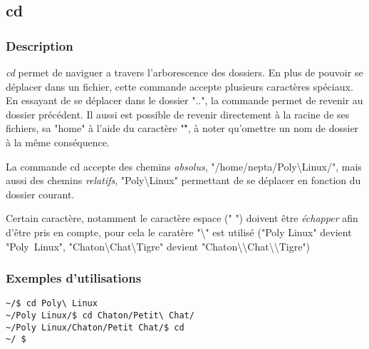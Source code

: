 \subsection{cd}
\subsubsection{Description}
\emph{cd} permet de naviguer a travers l'arborescence des dossiers.
En plus de pouvoir se déplacer dans un fichier, cette commande accepte plusieurs caractères spéciaux.
En essayant de se déplacer dans le dossier "..", la commande permet de revenir au dossier précédent.
Il aussi est possible de revenir directement à la racine de ses fichiers, sa "home" à l'aide du caractère "\~", à noter qu'omettre un nom de dossier à la même conséquence.

La commande cd accepte des chemins \emph{absolus}, "/home/nepta/Poly\textbackslash Linux/", mais aussi des chemins \emph{relatifs}, "Poly\textbackslash \textvisiblespace Linux" permettant de se déplacer en fonction du dossier courant.

Certain caractère, notamment le caractère espace (" ") doivent être \emph{échapper} afin d'être pris en compte, pour cela le caratère "\textbackslash" est utilisé ("Poly Linux" devient "Poly\ Linux",
"Chaton\textbackslash Chat\textbackslash Tigre" devient "Chaton\textbackslash \textbackslash Chat\textbackslash \textbackslash Tigre")

\subsubsection{Exemples d'utilisations}

\begin{lstlisting}
~/$ cd Poly\ Linux
~/Poly Linux/$ cd Chaton/Petit\ Chat/
~/Poly Linux/Chaton/Petit Chat/$ cd
~/ $ 
\end{lstlisting}
